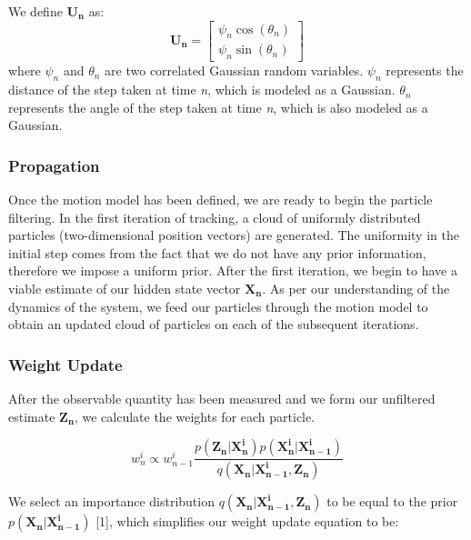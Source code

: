 \documentclass[12pt, a4paper]{article}
\begin{document}
				We define $ \mathbf{U_{n}} $ as:
				\begin{equation}
					\mathbf{U_{n}} = 
					\left[
					\begin{matrix}
		
						\psi_{n} \cos(\theta_{n})\\
						\psi_{n} \sin(\theta_{n})

					\end{matrix}
					\right]
				\end{equation}
				where $\psi_{n}$ and $\theta_{n}$ are two correlated Gaussian random variables. $\psi_{n}$ represents the distance of the step taken at time \textit{n}, which is modeled as a Gaussian. $\theta_{n}$ represents the angle of the step taken at time \textit{n}, which is also modeled as a Gaussian.

		\subsubsection{Propagation}
			Once the motion model has been defined, we are ready to begin the particle filtering. In the first iteration of tracking, a cloud of uniformly distributed particles (two-dimensional position vectors) are generated. The uniformity in the initial step comes from the fact that we do not have any prior information, therefore we impose a uniform prior. After the first iteration, we begin to have a viable estimate of our hidden state vector $\mathbf{X_{n}}$. As per our understanding of the dynamics of the system, we feed our particles through the motion model to obtain an updated cloud of particles on each of the subsequent iterations. 

		\subsubsection{Weight Update}
			After the observable quantity has been measured and we form our unfiltered estimate $ \mathbf{Z_{n}}$, we calculate the weights for each particle.

			\begin{equation}
				w_n^i \propto w_{n-1}^i  \frac{\mathit{p}(\mathbf{Z_n}|\mathbf{X_n^i})\mathit{p}(\mathbf{X_n^i}|\mathbf{X_{n-1}^i})}{\mathit{q}(\mathbf{X_n}|\mathbf{X_{n-1}^i}, \mathbf{Z_n})}
			\end{equation}

			We select an importance distribution $\mathit{q}(\mathbf{X_n}|\mathbf{X_{n-1}^i}, \mathbf{Z_n})$ to be equal to the prior $\mathit{p}(\mathbf{X_n}|\mathbf{X_{n-1}^i})$ [1], which simplifies our weight update equation to be:
			
\end{document}
